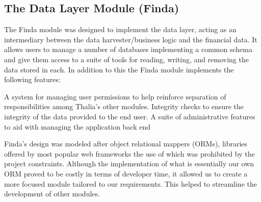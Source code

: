 \documentclass[main.tex]{subfiles}
\begin{document}
\subsection{The Data Layer Module (Finda)}

The Finda module was designed to implement the data layer, acting as an intermediary between the data harvester/business logic and the financial data. It allows users to manage a number of databases implementing a common schema and give them access to a suite of tools for reading, writing, and removing the data stored in each. In addition to this the Finda module implements the following features:

A system for managing user permissions to help reinforce separation of responsibilities among Thalia's other modules. 
Integrity checks to ensure the integrity of the data provided to the end user. 
A suite of administrative features to aid with managing the application back end

Finda's design was modeled after object relational mappers (ORMs), libraries offered by most popular web frameworks the use of which was prohibited by the project constraints. Although the implementation of what is essentially our own ORM proved to be costly in terms of developer time, it allowed us to create a more focused module tailored to our requirements. This helped to streamline the development of other modules.
\end{document}
